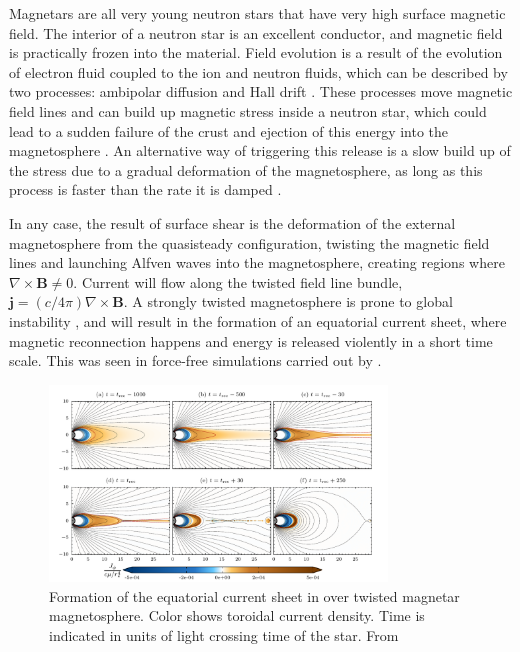 Magnetars are all very young neutron stars that have very high surface magnetic
field. The interior of a neutron star is an excellent conductor, and magnetic
field is practically frozen into the material. Field evolution is a result of
the evolution of electron fluid coupled to the ion and neutron fluids, which can
be described by two processes: ambipolar diffusion and Hall drift
\citep{goldreich_magnetic_1992}. These processes move magnetic field lines and
can build up magnetic stress inside a neutron star, which could lead to a sudden
failure of the crust and ejection of this energy into the magnetosphere
\citep{thompson_soft_1995, thompson_giant_2001}. An alternative way of
triggering this release is a slow build up of the stress due to a gradual
deformation of the magnetosphere, as long as this process is faster than the
rate it is damped \citep{lyutikov_magnetar_2006}.

In any case, the result of surface shear is the deformation of the external
magnetosphere from the quasisteady configuration, twisting the magnetic field
lines and launching Alfven waves into the magnetosphere, creating regions where
$\nabla\times \mathbf{B} \neq 0$. Current will flow along the twisted field line
bundle, $\mathbf{j} = (c/4\pi)\nabla\times \mathbf{B}$. A strongly twisted
magnetosphere is prone to global instability \citep{uzdensky_shear-driven_2002},
and will result in the formation of an equatorial current sheet, where magnetic
reconnection happens and energy is released violently in a short time scale.
This was seen in force-free simulations carried out by
\citep{parfrey_dynamics_2013}.

\begin{figure}[h]
  \centering
  \includegraphics[width=0.8\textwidth]{pics/intro/ffe-giant-flare.png}
  \caption[Formation of the equatorial current sheet in an over-twisted magnetar
    magnetosphere.]{Formation of the equatorial current sheet in over twisted magnetar
    magnetosphere. Color shows toroidal current density. Time is indicated in
    units of light crossing time of the star. From \citep{parfrey_dynamics_2013}}
  \label{fig:overtwisted-magnetar}
\end{figure}


